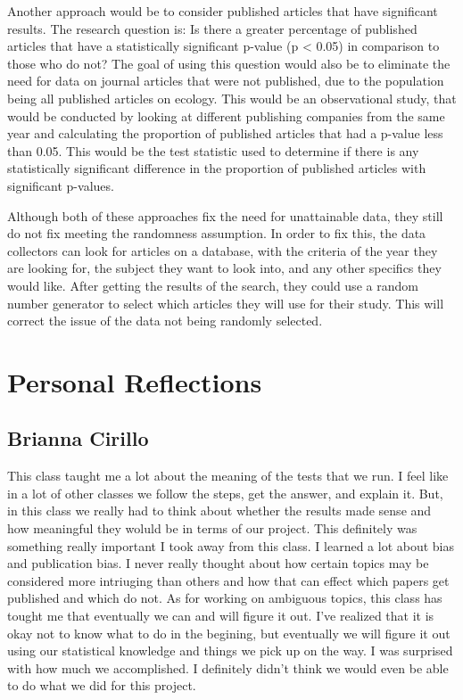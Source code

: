 \documentclass[12pt, letterpaper]{article}
\begin{document}
Another approach would be to consider published articles that have significant results. The research question is: Is there a greater percentage of published articles that have a statistically significant p-value (p < 0.05) in comparison to those who do not? The goal of using this question would also be to  eliminate the need for data on journal articles that were not published, due to the population being all published articles on ecology. This would be an observational study, that would be conducted by looking at different publishing companies from the same year and calculating the proportion of published articles that had a p-value less than 0.05. This would be the test statistic used to determine if there is any statistically significant difference in the proportion of published articles with significant p-values. 

Although both of these approaches fix the need for unattainable data, they still do not fix meeting the randomness assumption. In order to fix this, the data collectors can look for articles on a database, with the criteria of the year they are looking for, the subject they want to look into, and any other specifics they would like. After getting the results of the search, they could use a random number generator to select which articles they  will use for their study. This will correct the issue of the data not being randomly selected.

\section{Personal Reflections}
\subsection{Brianna Cirillo}
This class taught me a lot about the meaning of the tests that we run. I feel like in a lot of other classes we follow the steps, get the answer, and explain it. But, in this class we really had to think about whether the results made sense and how meaningful they woluld be in terms of our project. This definitely was something really important I took away from this class. I learned a lot about bias and publication bias. I never really thought about how certain topics may be considered more intriuging than others and how that can effect which papers get published and which do not. As for working on ambiguous topics, this class has tought me that eventually we can and will figure it out. I've realized that it is okay not to know what to do in the begining, but eventually we will figure it out using our statistical knowledge and things we pick up on the way. I was surprised with how much we accomplished. I definitely didn't think we would even be able to do what we did for this project.   
\end{document}

